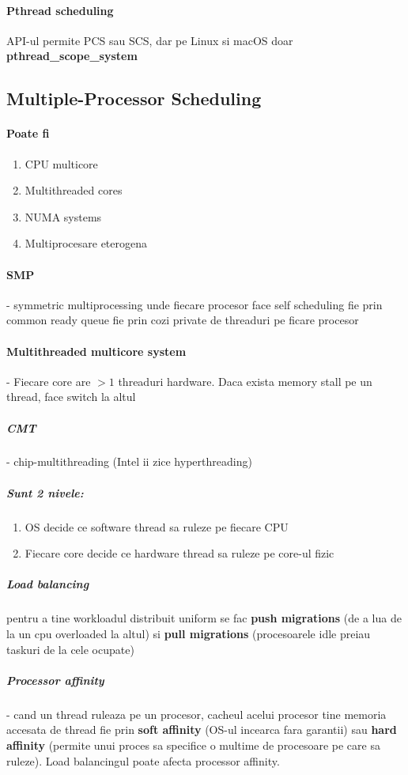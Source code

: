 \documentclass{article}
\begin{document}
\paragraph*{Pthread scheduling} API-ul permite PCS sau SCS, dar pe Linux si macOS  doar \textbf{pthread\_scope\_system}

\subsection*{Multiple-Processor Scheduling}
\paragraph*{Poate fi}
\begin{enumerate}
    \item CPU multicore
    \item Multithreaded cores
    \item NUMA systems
    \item Multiprocesare eterogena
\end{enumerate}
\paragraph*{SMP} - symmetric multiprocessing unde fiecare procesor face self scheduling fie prin common ready queue fie prin cozi private de threaduri pe ficare procesor
\paragraph*{Multithreaded multicore system} - Fiecare core are $> 1$ threaduri hardware. Daca exista memory stall pe un thread, face switch la altul
\subparagraph*{CMT} - chip-multithreading (Intel ii zice hyperthreading)
\subparagraph*{Sunt 2 nivele:}
\begin{enumerate}
    \item OS decide ce software thread sa ruleze pe fiecare CPU
    \item Fiecare core decide ce hardware thread sa ruleze pe core-ul fizic
\end{enumerate}
\subparagraph*{Load balancing} pentru a tine workloadul distribuit uniform se fac \textbf{push migrations} (de a lua de la un cpu overloaded la altul) si \textbf{pull migrations} (procesoarele idle preiau taskuri de la cele ocupate)
\subparagraph*{Processor affinity} - cand un thread ruleaza pe un procesor, cacheul acelui procesor tine memoria accesata de thread fie prin \textbf{soft affinity} (OS-ul incearca fara garantii) sau \textbf{hard affinity} (permite unui proces sa specifice o multime de procesoare pe care sa ruleze). Load balancingul poate afecta processor affinity.
\end{document}
